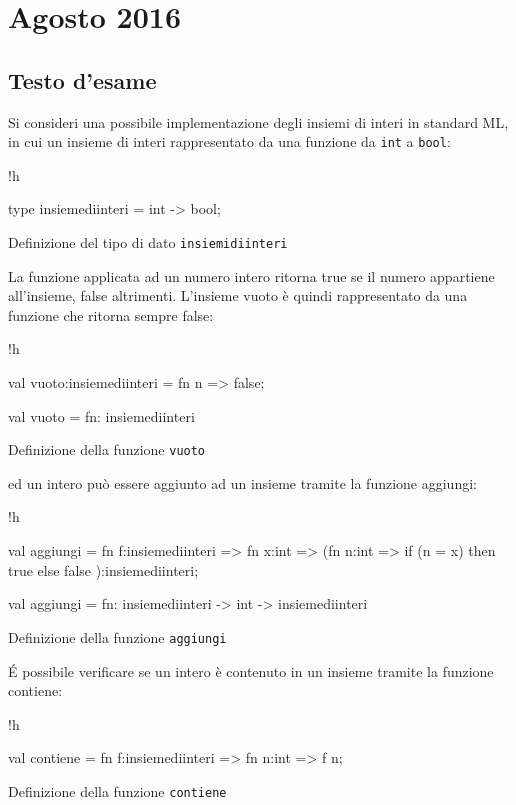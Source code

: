 \section{Agosto 2016}

\subsection{Testo d'esame}

Si consideri una possibile implementazione degli insiemi di interi in standard ML, in cui un insieme di interi rappresentato da una funzione da \texttt{int} a \texttt{bool}:

\begin{listing}{!h}
\begin{smlcode}
type insiemediinteri = int -> bool;
\end{smlcode}
\caption[]{Definizione del tipo di dato \texttt{insiemidiinteri}}
\end{listing}

La funzione applicata ad un numero intero ritorna true se il numero appartiene all'insieme, false altrimenti. L'insieme vuoto è quindi rappresentato da una funzione che ritorna sempre false:

\begin{listing}{!h}
\begin{smlcode}
val vuoto:insiemediinteri = fn n => false;

val vuoto = fn: insiemediinteri
\end{smlcode}
\caption{Definizione della funzione \texttt{vuoto}}
\end{listing}

ed un intero può essere aggiunto ad un insieme tramite la funzione aggiungi:

\begin{listing}{!h}
\begin{smlcode}
val aggiungi = fn f:insiemediinteri => fn x:int =>
(fn n:int => if (n = x) then
							true
						else
							false
):insiemediinteri;

val aggiungi = fn: insiemediinteri -> int -> insiemediinteri
\end{smlcode}
\caption[]{Definizione della funzione \texttt{aggiungi}}
\end{listing}

\'E possibile verificare se un intero è contenuto in un insieme tramite la funzione contiene:

\begin{listing}{!h}
\begin{smlcode}
val contiene = fn f:insiemediinteri => fn n:int => f n;
\end{smlcode}
\caption[]{Definizione della funzione \texttt{contiene}}
\end{listing}

